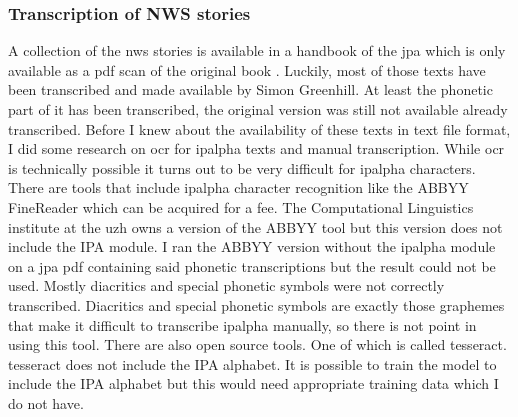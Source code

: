 \subsubsection*{Transcription of NWS stories}
A collection of the \ac{nws} stories is available in a handbook of the \ac{jpa} which is only available as a pdf scan of the original book \citep{JIPA2010}. Luckily, most of those texts have been transcribed and made available by Simon Greenhill. At least the phonetic part of it has been transcribed, the original version was still not available already transcribed. Before I knew about the availability of these texts in text file format, I did some research on \ac{ocr} for \ac{ipalpha} texts and manual transcription. While \ac{ocr} is technically possible it turns out to be very difficult for \ac{ipalpha} characters. There are tools that include \ac{ipalpha} character recognition like the ABBYY FineReader which can be acquired for a fee. The Computational Linguistics institute at the \ac{uzh} owns a version of the ABBYY tool but this version does not include the IPA module. I ran the ABBYY version without the \ac{ipalpha} module on a \ac{jpa} pdf containing said phonetic transcriptions but the result could not be used. Mostly diacritics and special phonetic symbols were not correctly transcribed. Diacritics and special phonetic symbols are exactly those graphemes that make it difficult to transcribe \ac{ipalpha} manually, so there is not point in using this tool. There are also open source tools. One of which is called tesseract. tesseract does not include the IPA alphabet. It is possible to train the model to include the IPA alphabet but this would need appropriate training data which I do not have.

